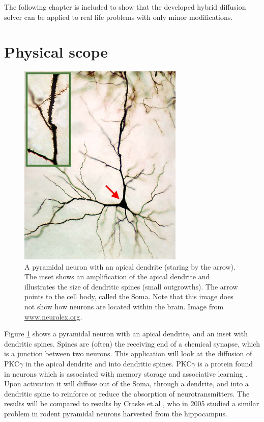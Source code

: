 The following chapter is included to show that the developed hybrid diffusion solver can be applied to real life problems with only minor modifications.

\section{Physical scope}

\begin{figure}[H]
 \centering
 \includegraphics[width=0.7\textwidth]{Figures/Cochlear_nucleus_multipolar_cell.jpg}
 \caption[Pyramidal neuron]{A pyramidal neuron with an apical dendrite (staring by the arrow). The inset shows an amplification of the apical dendrite and illustrates the size of dendritic spines (small outgrowths). The arrow points to the cell body, called the Soma. Note that this image does not show how neurons are located within the brain. Image from \url{www.neurolex.org}.}
 \label{application:pyramidal_neuron}
\end{figure}

Figure \ref{application:pyramidal_neuron} shows a pyramidal neuron with an apical dendrite, and an inset with dendritic spines. 
Spines are (often) the receiving end of a chemical synapse, which is a junction between two neurons. 
This application will look at the diffusion of PKC$\gamma$ in the apical dendrite and into dendritic spines. 
PKC$\gamma$ is a protein found in neurons which is associated with memory storage and associative learning \cite{saito2002protein}. 
Upon activation it will diffuse out of the Soma, through a dendrite, and into a dendritic spine to reinforce or reduce the absorption of neurotransmitters. 
The results will be compared to results by Craske et.al \cite{craske2005spines}, who in 2005 studied a similar problem in rodent pyramidal neurons harvested from the hippocampus.

